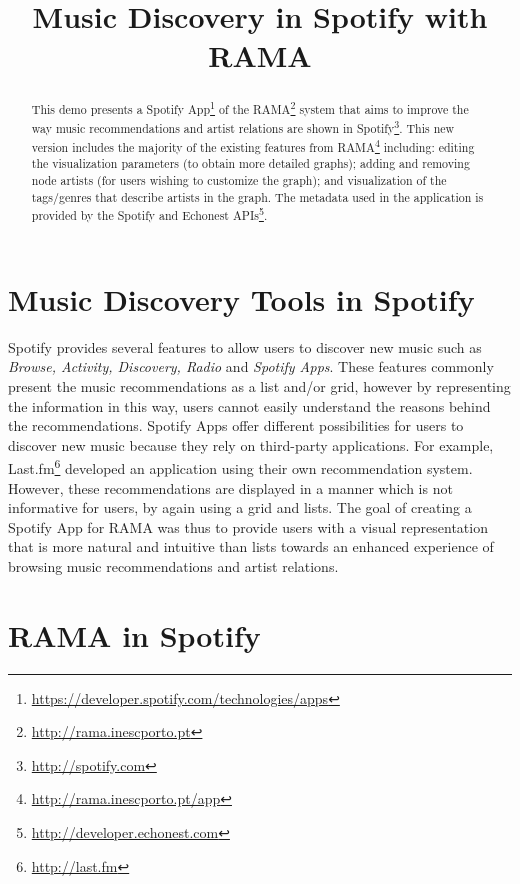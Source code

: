 \documentclass{article}
\title{Music Discovery in Spotify with RAMA}
\begin{document}
\maketitle

\begin{abstract}
  This demo presents a Spotify App\footnote{\url{https://developer.spotify.com/technologies/apps}} of the RAMA\footnote{\url{http://rama.inescporto.pt}} system that aims to improve the way music recommendations and artist relations are shown in Spotify\footnote{\url{http://spotify.com}}.  This new version includes the majority of the existing features from RAMA\footnote{\url{http://rama.inescporto.pt/app}} including: editing the visualization parameters (to obtain more detailed graphs); adding and removing node artists (for users wishing to customize the graph); and visualization of the tags/genres that describe artists in the graph.
  The metadata used in the application is provided by the Spotify and Echonest APIs\footnote{\url{http://developer.echonest.com}}.
\end{abstract}

  \section{Music Discovery Tools in Spotify}
  \label{sec:spotify_tools}
  

    Spotify provides several features to allow users to discover new music such as \textit{Browse, Activity, Discovery, Radio} and \textit{Spotify Apps}.
    These features commonly present the music recommendations as a list and/or grid, however by representing the information in this way, users cannot easily understand the reasons behind the recommendations. 
    Spotify Apps offer different possibilities for users to discover new music because they rely on third-party applications. For example, Last.fm\footnote{\url{http://last.fm}} developed an application using their own recommendation system.
  However, these recommendations are displayed in a manner which is not informative for users, by again using a grid and lists. 
    The goal of creating a Spotify App for RAMA was thus to provide users with a visual representation that is more natural and intuitive than lists towards an enhanced experience of browsing music recommendations and artist relations. 

  \section{RAMA in Spotify}
  \label{sec:rama}
  
\end{document}
